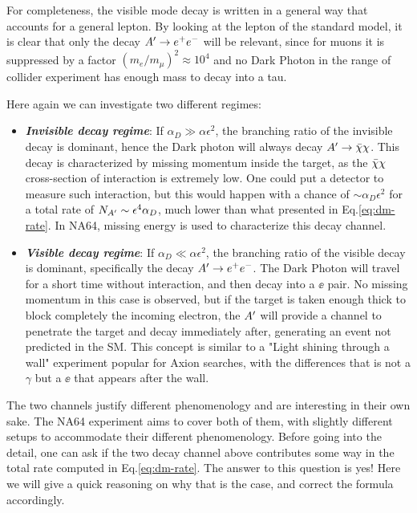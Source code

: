 For completeness, the visible mode decay is written in a general way that accounts for a general lepton. By looking at the lepton of the standard model, it is clear that only the decay $A' \to e^+e^-$ will be relevant, since for muons it is suppressed by a factor $(m_e/m_{\mu})^2 \approx 10^4$ and no Dark Photon in the range of collider experiment has enough mass to decay into a tau.

Here again we can investigate two different regimes:
\begin{itemize}
\item \textbf{\textit{Invisible decay regime}}: If $\alpha_D \gg \alpha \epsilon^2$, the branching ratio of the invisible decay is dominant, hence the Dark photon will always decay $A' \to \bar{\chi} \chi$. This decay is characterized by missing momentum inside the target, as the $\bar{\chi} \chi$ cross-section of interaction is extremely low. One could put a detector to measure such interaction, but this would happen with a chance of $\sim \alpha_D \epsilon^2$ for a total rate of $N_{A'} \sim \epsilon^4 \alpha_D$, much lower than what presented in Eq.\ref{eq:dm-rate}. In NA64, missing energy is used to characterize this decay channel. 
\item \textbf{\textit{Visible decay regime}}: If $\alpha_D \ll \alpha \epsilon^2$, the branching ratio of the visible decay is dominant, specifically the decay $A' \to e^+e^-$. The Dark Photon will travel for a short time without interaction, and then decay into a $\ee$ pair. No missing momentum in this case is observed, but if the target is taken enough thick to block completely the incoming electron, the $A'$ will provide a channel to penetrate the target and decay immediately after, generating an event not predicted in the SM. This concept is similar to a "Light shining through a wall" experiment popular for Axion searches, with the differences that is not a $\gamma$ but a $\ee$ that appears after the wall.
\end{itemize}

The two channels justify different phenomenology and are interesting in their own sake. The NA64 experiment aims to cover both of them, with slightly different setups to accommodate their different phenomenology. Before going into the detail, one can ask if the two decay channel above contributes some way in the total rate computed in Eq.\ref{eq:dm-rate}. The answer to this question is yes! Here we will give a quick reasoning on why that is the case, and correct the formula accordingly.

